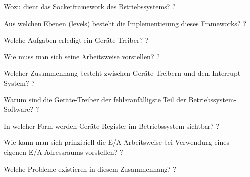 \documentclass[avery5371]{flashcards}
\begin{document}
\begin{flashcard}[Netzwerkmanagement]{Wozu dient das Socketframework des Betriebssystems?}
    ?
\end{flashcard}

\begin{flashcard}[Netzwerkmanagement]{Aus welchen Ebenen (levels) besteht die Implementierung dieses Frameworks?}
    ?
\end{flashcard}

\begin{flashcard}{Welche Aufgaben erledigt ein Geräte-Treiber?}
    ?
\end{flashcard}

\begin{flashcard}{Wie muss man sich seine Arbeitsweise vorstellen?}
    ?
\end{flashcard}

\begin{flashcard}{Welcher Zusammenhang besteht zwischen Geräte-Treibern und dem Interrupt-System?}
    ?
\end{flashcard}

\begin{flashcard}{Warum sind die Geräte-Treiber der fehleranfälligste Teil der Betriebssystem-Software?}
    ?
\end{flashcard}

\begin{flashcard}{In welcher Form werden Geräte-Register im Betriebssystem sichtbar?}
    ?
\end{flashcard}

\begin{flashcard}{Wie kann man sich prinzipiell die E/A-Arbeitsweise bei Verwendung eines eigenen E/A-Adressraums vorstellen?}
    ?
\end{flashcard}

\begin{flashcard}{Welche Probleme existieren in diesem Zusammenhang?}
    ?
\end{flashcard}
\end{document}
